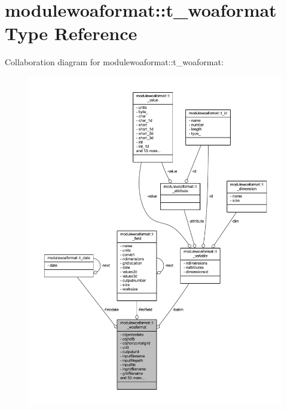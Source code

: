 \hypertarget{structmodulewoaformat_1_1t__woaformat}{}\section{modulewoaformat\+:\+:t\+\_\+woaformat Type Reference}
\label{structmodulewoaformat_1_1t__woaformat}


Collaboration diagram for modulewoaformat\+:\+:t\+\_\+woaformat\+:\nopagebreak
\begin{figure}[H]
\begin{center}
\leavevmode
\includegraphics[width=350pt]{structmodulewoaformat_1_1t__woaformat__coll__graph}
\end{center}
\end{figure}
